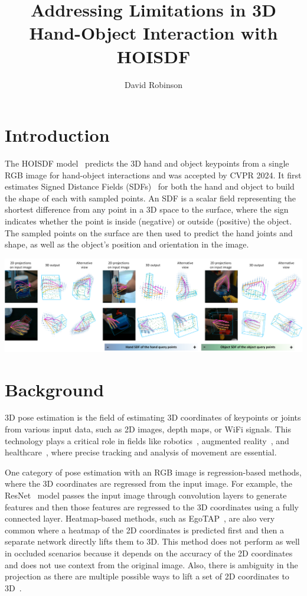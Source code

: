 \documentclass{article}
\title{Addressing Limitations in 3D Hand-Object Interaction with HOISDF}
\author{David Robinson}
\date{}
\begin{document}
\maketitle

\section*{Introduction}

The HOISDF model~\cite{qi2024hoisdf} predicts the 3D hand and object keypoints from a single RGB image for hand-object interactions and was accepted by CVPR 2024. It first estimates Signed Distance Fields (SDFs)~\cite{ma2021neuralpull} for both the hand and object to build the shape of each with sampled points. An SDF is a scalar field representing the shortest difference from any point in a 3D space to the surface, where the sign indicates whether the point is inside (negative) or outside (positive) the object. The sampled points on the surface are then used to predict the hand joints and shape, as well as the object's position and orientation in the image.

\begin{center}
    \includegraphics[scale=0.24]{hoisdf-1.png}
\end{center}

\section*{Background}

3D pose estimation is the field of estimating 3D coordinates of keypoints or joints from various input data, such as 2D images, depth maps, or WiFi signals. This technology plays a critical role in fields like robotics~\cite{billard2019robotics}, augmented reality~\cite{chen2019augmentedreality}, and healthcare~\cite{stenum2021health}, where precise tracking and analysis of movement are essential.

One category of pose estimation with an RGB image is regression-based methods, where the 3D coordinates are regressed from the input image. For example, the ResNet~\cite{he2016resnet} model passes the input image through convolution layers to generate features and then those features are regressed to the 3D coordinates using a fully connected layer. Heatmap-based methods, such as EgoTAP~\cite{kang2024egotap}, are also very common where a heatmap of the 2D coordinates is predicted first and then a separate network directly lifts them to 3D. This method does not perform as well in occluded scenarios because it depends on the accuracy of the 2D coordinates and does not use context from the original image. Also, there is ambiguity in the projection as there are multiple possible ways to lift a set of 2D coordinates to 3D~\cite{zhou2024lifting}.
\end{document}
